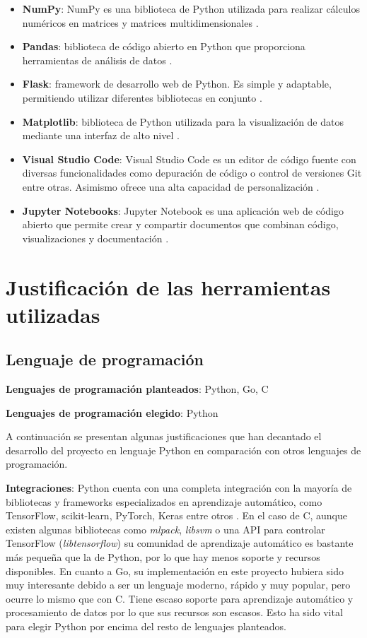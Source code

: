 \begin{itemize}
\item \textbf{NumPy}: NumPy es una biblioteca de Python utilizada para realizar cálculos numéricos en matrices y matrices multidimensionales \cite{NumPy}. 

\item \textbf{Pandas}: biblioteca de código abierto en Python que proporciona herramientas de análisis de datos \cite{pandas}. 

\item \textbf{Flask}: framework de desarrollo web de Python. Es simple y adaptable, permitiendo utilizar diferentes bibliotecas en conjunto \cite{Flask}. 

\item \textbf{Matplotlib}: biblioteca de Python utilizada para la visualización de datos mediante una interfaz de alto nivel \cite{matplotlib}. 

\item \textbf{Visual Studio Code}: Visual Studio Code es un editor de código fuente con diversas funcionalidades como depuración de código o control de versiones Git entre otras. Asimismo ofrece una alta capacidad de personalización \cite{Microsoft_2021}. 

\item \textbf{Jupyter Notebooks}: Jupyter Notebook es una aplicación web de código abierto que permite crear y compartir documentos que combinan código, visualizaciones y documentación \cite{Jupyter}. 
\end{itemize}

\section{Justificación de las herramientas utilizadas}

\subsection{Lenguaje de programación}
\textbf{Lenguajes de programación planteados}: Python, Go, C

\textbf{Lenguajes de programación elegido}: Python

A continuación se presentan algunas justificaciones que han decantado el desarrollo del proyecto en lenguaje Python en comparación con otros lenguajes de programación.

\textbf{Integraciones}: Python cuenta con una completa integración con la mayoría de bibliotecas y frameworks especializados en aprendizaje automático, como TensorFlow, scikit-learn, PyTorch, Keras entre otros \cite{Team_2023}.
En el caso de C, aunque existen algunas bibliotecas como \textit{mlpack}, \textit{libsvm} o una API para controlar TensorFlow (\textit{libtensorflow}) su comunidad de aprendizaje automático es bastante más pequeña que la de Python, por lo que hay menos soporte y recursos disponibles.
En cuanto a Go, su implementación en este proyecto hubiera sido muy interesante debido a ser un lenguaje moderno, rápido y muy popular, pero ocurre lo mismo que con C. Tiene escaso soporte para aprendizaje automático y procesamiento de datos por lo que sus recursos son escasos.
Esto ha sido vital para elegir Python por encima del resto de lenguajes planteados.

